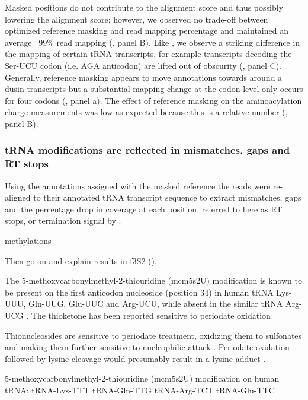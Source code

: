 \documentclass[9pt,lineno]{elife}
\begin{document}
Masked positions do not contribute to the alignment score and thus possibly lowering the alignment score; however, we observed no trade-off between optimized reference masking and read mapping percentage and maintained an average ~99\% read mapping (, panel B).
Like \cite{Behrens2021-gb}, we observe a striking difference in the mapping of certain tRNA transcripts, for example transcripts decoding the Ser-UCU codon (i.e. AGA anticodon) are lifted out of obscurity (, panel C).
Generally, reference masking appears to move annotations towards
around a dusin transcripts but a substantial mapping change at the codon level only occurs for four codons (, panel a).
The effect of reference masking on the aminoacylation charge measurements was low as expected because this is a relative number (, panel B).





\subsubsection{tRNA modifications are reflected in mismatches, gaps and RT stops}


Using the annotations assigned with the masked reference the reads were re-aligned to their annotated tRNA transcript sequence to extract mismatches, gaps and the percentage drop in coverage at each position, referred to here as RT stops, or termination signal by \cite{Wang2021-fc}.


methylations \citep{Clark2016-ph}


Then go on and explain results in f3S2 ().



The 5-methoxycarbonylmethyl-2-thiouridine (mcm5s2U) modification is known to be present on the first anticodon nucleoside (position 34) in human tRNA Lys-UUU, Gln-UUG, Glu-UUC and Arg-UCU, while absent in the similar tRNA Arg-UCG \citep{Lentini2018-xs}.
The thioketone has been reported sensitive to periodate oxidation



Thionucleosides are sensitive to periodate treatment, oxidizing them to sulfonates and making them further sensitive to nucleophilic attack \citep{Ziff1968-la, Rao1974-zq}.
Periodate oxidation followed by lysine cleavage would presumably result in a lysine adduct \citep{Ziff1968-la}.

5-methoxycarbonylmethyl-2-thiouridine (mcm5s2U) modification on human tRNA:
tRNA-Lys-TTT
tRNA-Gln-TTG
tRNA-Arg-TCT
tRNA-Glu-TTC
\citep{Lentini2018-xs}
\end{document}
